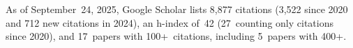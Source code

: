 %
As of September~24, 2025, Google Scholar lists
8,877 citations (3,522 since 2020 and 712 new citations in 2024),
an h-index of~42 (27~counting only citations since 2020),
and 17~papers with 100+~citations, including 5~papers with 400+.
